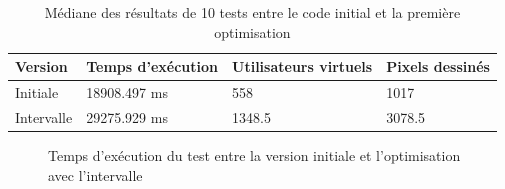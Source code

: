 





\begin{table}[H]
  \centering
  \begin{tabular}{|l|l|l|l|}
    \hline
    \textbf{Version} & \textbf{Temps d'exécution} & \textbf{Utilisateurs virtuels} & \textbf{Pixels dessinés} \\ \hline
    Initiale         & 18908.497 ms               & 558                            & 1017                     \\ \hline
    Intervalle       & 29275.929 ms               & 1348.5                         & 3078.5                   \\ \hline
  \end{tabular}
  \caption{Médiane des résultats de 10 tests entre le code initial et la première optimisation}
  \label{table:first-opti-results}
\end{table}

\begin{figure}[H]
  \centering
  \caption{Temps d'exécution du test entre la version initiale et l'optimisation avec l'intervalle}
  \label{fig:chart-opti-initial-interval-duration}
\end{figure}

